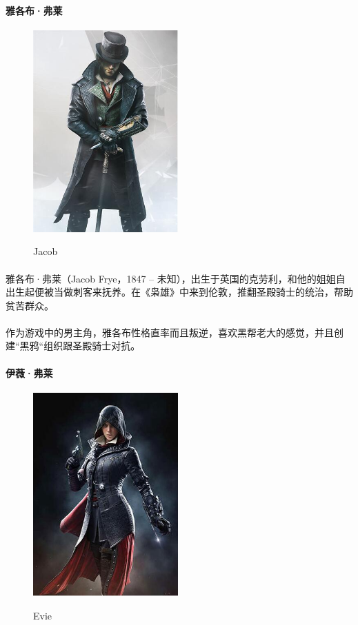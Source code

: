 \documentclass{article} \usepackage{CJK}
\begin{document}
\paragraph{雅各布·弗莱}
\begin{figure}[!h]
  \centering
  \includegraphics[width=15em]{jacob.jpg}\\
  \caption{Jacob}\label{1-1}
\end{figure}
\paragraph{}
雅各布·弗莱（Jacob Frye，1847 – 未知），出生于英国的克劳利，和他的姐姐自出生起便被当做刺客来抚养。在《枭雄》中来到伦敦，推翻圣殿骑士的统治，帮助贫苦群众。
\paragraph{}
作为游戏中的男主角，雅各布性格直率而且叛逆，喜欢黑帮老大的感觉，并且创建“黑鸦“组织跟圣殿骑士对抗。
\paragraph{伊薇·弗莱}
\begin{figure}[!h]
  \centering
  \includegraphics[width=15em]{evie.jpg}\\
  \caption{Evie}\label{1-2}
\end{figure}
\end{document}
